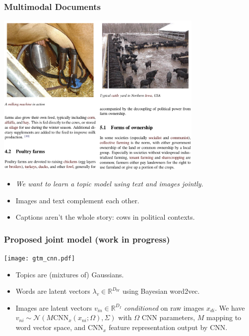 \documentclass{beamer}
\begin{document}
\begin{frame}
  \frametitle{Multimodal Documents}
  \begin{center}
    \includegraphics[width=0.75\textwidth]{assets/wiki_farm.pdf}
  \end{center}
             
  \begin{itemize}
  \item \emph{We want to learn a topic model using text and images jointly.}
  \item Images and text complement each other.
  \item Captions aren't the whole story: cows in political contexts.
  \end{itemize}
             
\end{frame}

\begin{frame}
  \frametitle{Proposed joint model (work in progress)}
  \begin{center}
    \texttt{[image: gtm\_cnn.pdf]}
  \end{center}
  {\small
  \begin{itemize}
  \item Topics are (mixtures of) Gaussians.
  \item Words are latent vectors $\lambda_v \in \mathbb{R}^{D_W}$ using Bayesian word2vec.
  \item Images are latent vectors $v_{in} \in \mathbb{R}^{D_I}$ \emph{conditioned} on raw images $x_{di}$. We have $v_{ni} \sim \mathcal{N}(M \text{CNN}_x(x_{ni} ; \Omega), \Sigma)$ with $\Omega$ CNN parameters, $M$ mapping to word vector space, and $\text{CNN}_x$ feature representation output by CNN.
  \end{itemize}
  \par}
\end{frame}
\end{document}
